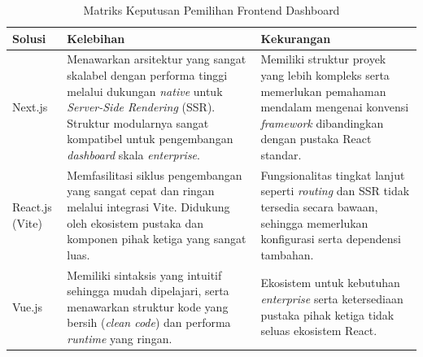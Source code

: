 \begin{table}[htbp]
    \centering
    \caption{Matriks Keputusan Pemilihan Frontend Dashboard}
    \label{tab:matriks_frontend}
    \begin{tabularx}{\textwidth}{|l|X|X|}
        \hline
        \textbf{Solusi} & \textbf{Kelebihan} & \textbf{Kekurangan} \\
        \hline
        Next.js & Menawarkan arsitektur yang sangat skalabel dengan performa tinggi melalui dukungan \textit{native} untuk \textit{Server-Side Rendering} (SSR). Struktur modularnya sangat kompatibel untuk pengembangan \textit{dashboard} skala \textit{enterprise}. & Memiliki struktur proyek yang lebih kompleks serta memerlukan pemahaman mendalam mengenai konvensi \textit{framework} dibandingkan dengan pustaka React standar. \\
        \hline
        React.js (Vite) & Memfasilitasi siklus pengembangan yang sangat cepat dan ringan melalui integrasi Vite. Didukung oleh ekosistem pustaka dan komponen pihak ketiga yang sangat luas. & Fungsionalitas tingkat lanjut seperti \textit{routing} dan SSR tidak tersedia secara bawaan, sehingga memerlukan konfigurasi serta dependensi tambahan. \\
        \hline
        Vue.js & Memiliki sintaksis yang intuitif sehingga mudah dipelajari, serta menawarkan struktur kode yang bersih (\textit{clean code}) dan performa \textit{runtime} yang ringan. & Ekosistem untuk kebutuhan \textit{enterprise} serta ketersediaan pustaka pihak ketiga tidak seluas ekosistem React. \\
        \hline
    \end{tabularx}
\end{table}